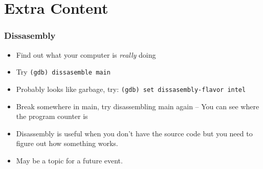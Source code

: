 \documentclass[aspectratio=169]{beamer}
\newcommand{\code}{\texttt}
\begin{document}
\section{Extra Content}
\begin{frame}[fragile]
    \frametitle{Dissasembly}
    \begin{itemize}
        \item Find out what your computer is \textit{really} doing
        \item Try \code{(gdb) dissasemble main}
        \pause
        \item Probably looks like garbage, try: \code{(gdb) set dissasembly-flavor intel}
        \pause
        \item Break somewhere in main, try disassembling main again \break -- You can see where the program counter is
        \pause
        \item Disassembly is useful when you don't have the source code but you need to figure out how something works.
        \item May be a topic for a future event.
    \end{itemize}
\end{frame}
\end{document}
